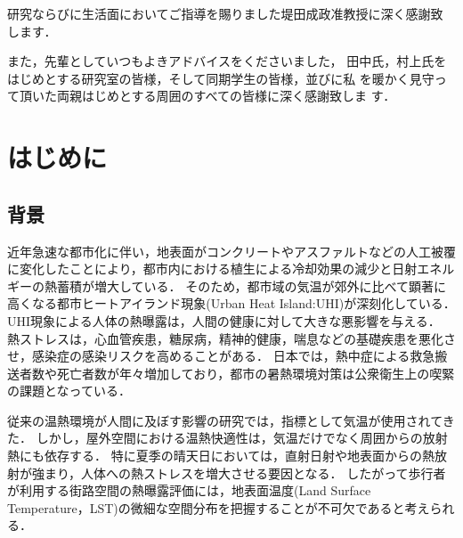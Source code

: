 \documentclass[12pt,epsf]{jreport}
\begin{document}
研究ならびに生活面においてご指導を賜りました堤田成政准教授に深く感謝致
します．

また，先輩としていつもよきアドバイスをくださいました，
田中氏，村上氏をはじめとする研究室の皆様，そして同期学生の皆様，並びに私
を暖かく見守って頂いた両親はじめとする周囲のすべての皆様に深く感謝致しま
す．

\tableofcontents %
\listoffigures %
\listoftables %


\chapter{はじめに}
\setcounter{page}{1}   %

 \section{背景}
 近年急速な都市化に伴い，地表面がコンクリートやアスファルトなどの人工被覆に変化したことにより，都市内における植生による冷却効果の減少と日射エネルギーの熱蓄積が増大している\cite{taha1997urban}．
 そのため，都市域の気温が郊外に比べて顕著に高くなる都市ヒートアイランド現象(Urban Heat Island:UHI)が深刻化している\cite{mikami2005urban}．
 UHI現象による人体の熱曝露は，人間の健康に対して大きな悪影響を与える．
 熱ストレスは，心血管疾患，糖尿病，精神的健康，喘息などの基礎疾患を悪化させ，感染症の感染リスクを高めることがある\cite{who2018heat}．
 日本では，熱中症による救急搬送者数や死亡者数が年々増加しており，都市の暑熱環境対策は公衆衛生上の喫緊の課題となっている\cite{env2022heat}．

 従来の温熱環境が人間に及ぼす影響の研究では，指標として気温が使用されてきた\cite{gonzalez1974experimental, ayoade1978spatial}．
 しかし，屋外空間における温熱快適性は，気温だけでなく周囲からの放射熱にも依存する\cite{matzarakis1999applications}．
 特に夏季の晴天日においては，直射日射や地表面からの熱放射が強まり，人体への熱ストレスを増大させる要因となる\cite{matzarakis1999applications}．
 したがって歩行者が利用する街路空間の熱曝露評価には，地表面温度(Land Surface Temperature，LST)の微細な空間分布を把握することが不可欠であると考えられる．
\end{document}
